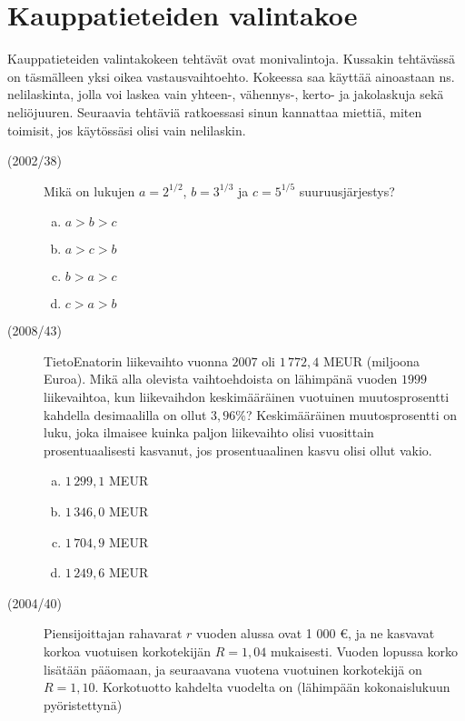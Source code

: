 \section{Kauppatieteiden valintakoe}

Kauppatieteiden valintakokeen tehtävät ovat monivalintoja. Kussakin tehtävässä on täsmälleen yksi oikea vastausvaihtoehto. Kokeessa saa käyttää ainoastaan ns. nelilaskinta, jolla voi laskea vain yhteen-, vähennys-, kerto- ja jakolaskuja sekä neliöjuuren. Seuraavia tehtäviä ratkoessasi sinun kannattaa miettiä, miten toimisit, jos käytössäsi olisi vain nelilaskin.

\begin{description}
	\item[(2002/38)] Mikä on lukujen $a=2^{1/2}$, $b=3^{1/3}$ ja $c=5^{1/5}$ suuruusjärjestys?
        
		\begin{enumerate}[(a)]
			\item $a>b>c$
			\item $a>c>b$
			\item $b>a>c$
			\item $c>a>b$
		\end{enumerate}


	\item[(2008/43)] TietoEnatorin liikevaihto vuonna $2007$ oli $1\,772{,}4$ MEUR (miljoona Euroa). Mikä
	alla olevista vaihtoehdoista on lähimpänä vuoden $1999$ liikevaihtoa, kun
	liikevaihdon keskimääräinen vuotuinen muutosprosentti kahdella desimaalilla on
	ollut $3{,}96 \%$? Keskimääräinen muutosprosentti on luku, joka ilmaisee kuinka paljon
	liikevaihto olisi vuosittain prosentuaalisesti kasvanut, jos prosentuaalinen kasvu olisi
	ollut vakio.
        
		\begin{enumerate}[(a)]
			\item $1\,299{,}1$ MEUR
			\item $1\,346{,}0$ MEUR
			\item $1\,704{,}9$ MEUR
			\item $1\,249{,}6$ MEUR
		\end{enumerate}


	\item[(2004/40)] Piensijoittajan rahavarat $r$ vuoden alussa ovat 1 000 \euro, ja ne kasvavat korkoa vuotuisen korkotekijän $R=1{,}04$ mukaisesti. Vuoden lopussa korko lisätään pääomaan, ja seuraavana vuotena vuotuinen korkotekijä on $R=1{,}10$. Korkotuotto kahdelta vuodelta on (lähimpään kokonaislukuun pyöristettynä)
        

\end{description}
